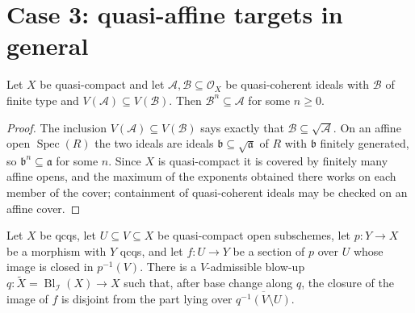 \section{Case 3: quasi-affine targets in general}

\begin{lemma}
  \label{lemma:nagata-finite-type-ideal-power-in-ideal}
  \leanok

  Let $X$ be quasi-compact and let $\mathcal A,\mathcal B\subseteq\mathcal O_X$ be
  quasi-coherent ideals with $\mathcal B$ of finite type and
  $V(\mathcal A)\subseteq V(\mathcal B)$.  Then $\mathcal B^n\subseteq\mathcal A$ for
  some $n\geq 0$.
\end{lemma}

\begin{proof}
  \leanok
  The inclusion $V(\mathcal A)\subseteq V(\mathcal B)$ says exactly that
  $\mathcal B\subseteq\sqrt{\mathcal A}$.  On an affine open $\operatorname{Spec}(R)$ the
  two ideals are ideals $\mathfrak b\subseteq\sqrt{\mathfrak a}$ of $R$ with
  $\mathfrak b$ finitely generated, so $\mathfrak b^n\subseteq\mathfrak a$ for some $n$.
  Since $X$ is quasi-compact it is covered by finitely many affine opens, and the maximum
  of the exponents obtained there works on each member of the cover; containment of
  quasi-coherent ideals may be checked on an affine cover.
\end{proof}

\begin{lemma}
  \label{lemma:nagata-conrad-case3-disjointness-reduction}
  \leanok

  Let $X$ be qcqs, let $U\subseteq V\subseteq X$ be quasi-compact open
  subschemes, let $p\colon Y\to X$ be a morphism with $Y$ qcqs, and let
  $f\colon U\to Y$ be a section of $p$ over $U$ whose image is closed in
  $p^{-1}(V)$.  There is a $V$-admissible blow-up
  $q\colon\widetilde X=\operatorname{Bl}_{\mathcal I}(X)\to X$ such that, after
  base change along $q$, the closure of the image of $f$ is disjoint from the
  part lying over $\overline{q^{-1}(V\setminus U)}$.
\end{lemma}


